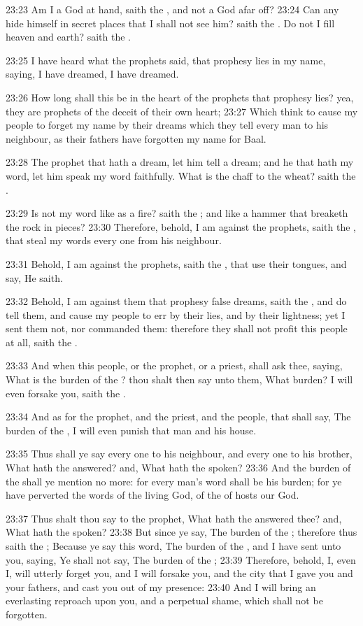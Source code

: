 23:23 Am I a God at hand, saith the \LORD, and not a God afar off?  23:24 Can any hide himself in secret places that I shall not see him?  saith the \LORD. Do not I fill heaven and earth? saith the \LORD.

23:25 I have heard what the prophets said, that prophesy lies in my name, saying, I have dreamed, I have dreamed.

23:26 How long shall this be in the heart of the prophets that prophesy lies? yea, they are prophets of the deceit of their own heart; 23:27 Which think to cause my people to forget my name by their dreams which they tell every man to his neighbour, as their fathers have forgotten my name for Baal.

23:28 The prophet that hath a dream, let him tell a dream; and he that hath my word, let him speak my word faithfully. What is the chaff to the wheat? saith the \LORD.

23:29 Is not my word like as a fire? saith the \LORD; and like a hammer that breaketh the rock in pieces?  23:30 Therefore, behold, I am against the prophets, saith the \LORD, that steal my words every one from his neighbour.

23:31 Behold, I am against the prophets, saith the \LORD, that use their tongues, and say, He saith.

23:32 Behold, I am against them that prophesy false dreams, saith the \LORD, and do tell them, and cause my people to err by their lies, and by their lightness; yet I sent them not, nor commanded them: therefore they shall not profit this people at all, saith the \LORD.

23:33 And when this people, or the prophet, or a priest, shall ask thee, saying, What is the burden of the \LORD? thou shalt then say unto them, What burden? I will even forsake you, saith the \LORD.

23:34 And as for the prophet, and the priest, and the people, that shall say, The burden of the \LORD, I will even punish that man and his house.

23:35 Thus shall ye say every one to his neighbour, and every one to his brother, What hath the \LORD answered? and, What hath the \LORD spoken?  23:36 And the burden of the \LORD shall ye mention no more: for every man's word shall be his burden; for ye have perverted the words of the living God, of the \LORD of hosts our God.

23:37 Thus shalt thou say to the prophet, What hath the \LORD answered thee? and, What hath the \LORD spoken?  23:38 But since ye say, The burden of the \LORD; therefore thus saith the \LORD; Because ye say this word, The burden of the \LORD, and I have sent unto you, saying, Ye shall not say, The burden of the \LORD; 23:39 Therefore, behold, I, even I, will utterly forget you, and I will forsake you, and the city that I gave you and your fathers, and cast you out of my presence: 23:40 And I will bring an everlasting reproach upon you, and a perpetual shame, which shall not be forgotten.

